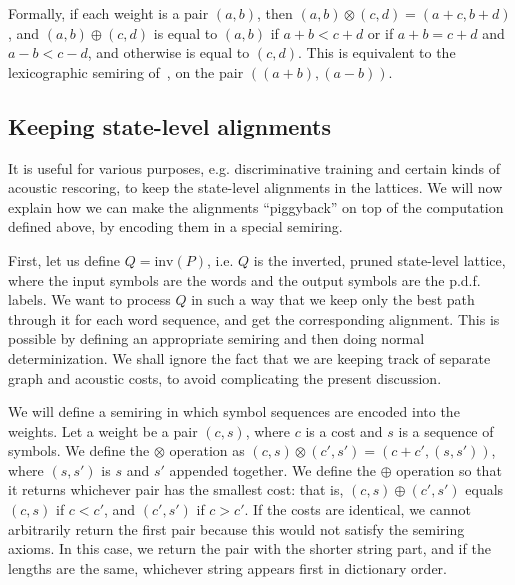 \documentclass{article}
\def\inv{{\mathrm{inv}}}
\begin{document}
Formally, if each weight is a pair $(a,b)$, then $(a,b) \otimes (c,d) = (a{+}c, b{+}d)$,
and $(a,b) \oplus (c,d)$ is equal to $(a,b)$ if $a{+}b < c{+}d$ or if $a{+}b = c{+}d$ and $a{-}b < c{-}d$,
and otherwise is equal to $(c,d)$.  This is equivalent to the lexicographic semiring 
of~\cite{roark2011lexicographic}, on the pair $((a{+}b),(a{-}b))$.

\subsection{Keeping state-level alignments}

It is useful for various purposes, e.g. discriminative training and certain kinds of
acoustic rescoring, to keep the state-level alignments in the lattices.  We will now
explain how we can make the alignments ``piggyback'' on top of the computation
defined above, by encoding them in a special semiring.

First, let us define $Q = \inv(P)$, i.e. $Q$ is the inverted, pruned state-level lattice,
where the input symbols are the words and the output symbols are the p.d.f. labels.
We want to process $Q$ in such a way that we keep only the best path through it
for each word sequence, and get the corresponding alignment.  This is possible
by defining an appropriate semiring and then doing normal determinization.  We shall
ignore the fact that we are keeping track of separate graph and acoustic costs, 
to avoid complicating the present discussion.  

We will define a semiring in which symbol sequences are encoded into the weights.
Let a weight be a pair $(c, s)$, where $c$ is a cost and $s$ is a sequence of symbols.
We define the $\otimes$ operation as $(c, s) \otimes (c', s') = (c+c', (s,s'))$, where
$(s,s')$ is $s$ and $s'$ appended together.  We define the $\oplus$ operation so that
it returns whichever pair has the smallest cost: that is, $(c,s) \oplus (c',s')$ 
equals $(c,s)$ if $c < c'$, and $(c',s')$ if $c > c'$.  If the costs are identical,
we cannot arbitrarily return the first pair because this would not satisfy the semiring
axioms.  In this case, we return the pair with the shorter string part, and if
the lengths are the same, whichever string appears first in dictionary order. 
\end{document}
